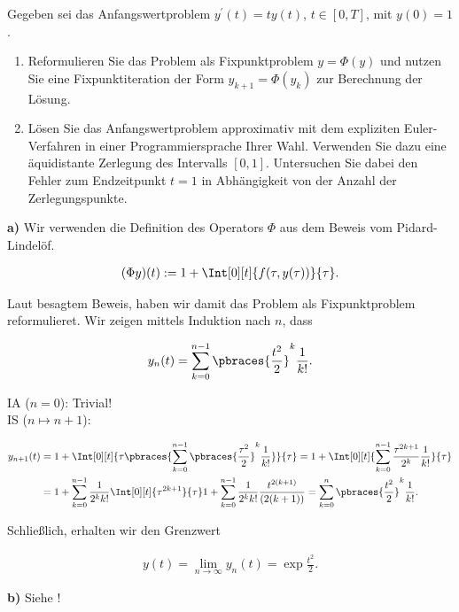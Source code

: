 \begin{exercise}

Gegeben sei das Anfangswertproblem $y^\prime(t) = t y(t)$, $t \in [0, T]$, mit $y(0) = 1$.

\begin{enumerate}[label = \textbf{\alph*)}]

  \item
  Reformulieren Sie das Problem als Fixpunktproblem $y = \Phi(y)$ und nutzen Sie eine Fixpunktiteration der Form $y_{k+1} = \Phi(y_k)$ zur Berechnung der Lösung.

  \item
  Lösen Sie das Anfangswertproblem approximativ mit dem expliziten Euler-Verfahren in einer
  Programmiersprache Ihrer Wahl.
  Verwenden Sie dazu eine äquidistante Zerlegung des Intervalls $[0, 1]$.
  Untersuchen Sie dabei den Fehler zum Endzeitpunkt $t = 1$ in Abhängigkeit von der Anzahl der Zerlegungspunkte.

\end{enumerate}

\end{exercise}

\begin{solution}

\textbf{a)}
Wir verwenden die Definition des Operators $\Phi$ aus dem Beweis vom Pidard-Lindelöf.

\begin{align*}
  (\Phi y)(t)
  :=
  1 + \Int[0][t]{f(\tau, y(\tau))}{\tau}.
\end{align*}

Laut besagtem Beweis, haben wir damit das Problem als Fixpunktproblem reformulieret.
Wir zeigen mittels Induktion nach $n$, dass

\begin{align*}
  y_n(t)
  =
  \sum_{k=0}^{n-1} \pbraces{\frac{t^2}{2}}^k \frac{1}{k!}.
\end{align*}

IA ($n = 0$):
Trivial! \\

IS ($n \mapsto n+1$):

\begin{align*}
  y_{n+1}(t)
  & =
  1 + \Int[0][t]
  {
    \tau \pbraces
    {
      \sum_{k=0}^{n-1}
      \pbraces{\frac{\tau^2}{2}}^k
      \frac{1}{k!}
    }
  }
  {\tau}
  =
  1 + \Int[0][t]
  {
    \sum_{k=0}^{n-1}
    \frac
    {\tau^{2k + 1}}
    {2^k}
    \frac{1}{k!}
  }
  {\tau} \\
  & =
  1 +
  \sum_{k=0}^{n-1}
  \frac{1}{2^k k!}
  \Int[0][t]{\tau^{2k + 1}}{\tau}
  1 +
  \sum_{k=0}^{n-1}
  \frac{1}{2^k k!}
  \frac{t^{2(k+1)}}{(2(k+1))}
  =
  \sum_{k=0}^n \pbraces{\frac{t^2}{2}}^k \frac{1}{k!}.
\end{align*}

Schließlich, erhalten wir den Grenzwert

\begin{align*}
  y(t)
  =
  \lim_{n \to \infty} y_n(t)
  =
  \exp{\frac{t^2}{2}}.
\end{align*}

\textbf{b)}
Siehe !

\end{solution}
